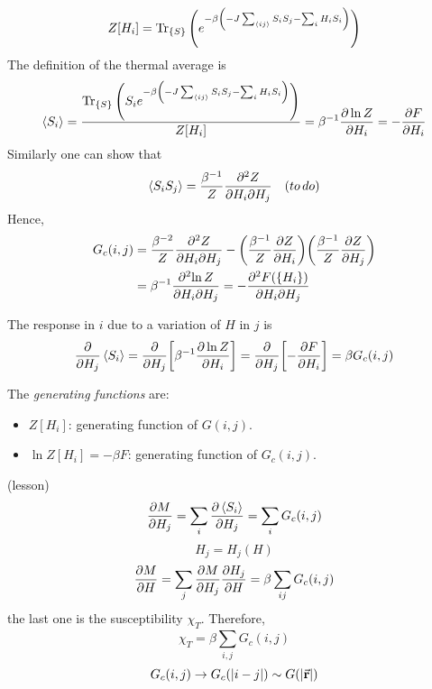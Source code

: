 \documentclass[../main/main.tex]{subfiles}
\begin{document}
\begin{equation}
  Z [H_i]= \Tr_{\{ S \} } \qty(e^{-\beta \qty(-J \sum_{\expval{ij} }^{} S_i S_j   - \sum_{i}^{} H_i S_i ) } )
\end{equation}
The definition of the thermal average is
\begin{equation}
  \expval{S_i} = \frac{\Tr_{\{ S \} } \qty(S_i e^{-\beta \qty(-J \sum_{\expval{ij} }^{} S_i S_j   - \sum_{i}^{} H_i S_i ) } ) }{Z[H_i]}
  = \beta ^{-1} \pdv{\ln{Z} }{H_i} = - \pdv{F}{H_i}
\end{equation}
Similarly one can show that
\begin{equation}
  \expval{S_i S_j} = \frac{\beta ^{-1}}{Z} \frac{\partial^2{Z} }{\partial{H_i} \partial{H_j}  } \quad (to \, do)
\end{equation}
Hence,
\begin{equation}
\begin{split}
  G_c (i,j) & = \frac{\beta ^{-2}}{Z}  \frac{\partial^2{Z} }{\partial{H_i} \partial{H_j}  }
  - \qty(\frac{\beta ^{-1}}{Z} \pdv{Z}{H_i} ) \qty(\frac{\beta ^{-1}}{Z} \pdv{Z}{H_j} ) \\
  & = \beta ^{-1} \frac{\partial^2{\ln{Z} } }{\partial{H_i} \partial{H_j}  }
  = - \frac{\partial^2{F(\{ H_i \}  )} }{\partial{H_i} \partial{H_j}  }
\end{split}
\end{equation}
\begin{remark}
  The response in \( i \) due to a variation of \( H \) in \( j \) is
  \begin{equation}
    \pdv{}{H_j} \expval{S_i} = \pdv{}{H_j} \qty[\beta ^{-1} \pdv{\ln{Z} }{H_i} ]  =\pdv{}{H_j} \qty[-\pdv{F}{H_i} ] =  \beta G_c (i,j)
  \end{equation}
\end{remark}

The \emph{generating functions} are:
\begin{itemize}
\item \( Z[H_i] \): generating function of \( G(i,j) \).
\item \( \ln{Z[H_i]} = - \beta F  \): generating function of \( G_c (i,j) \).
\end{itemize}

\begin{remark}
  (lesson)
  \begin{equation}
    \pdv{M}{H_j} = \sum_{i}^{} \pdv{\expval{S_i} }{H_j} = \sum_{i}^{} G_c (i,j)
  \end{equation}
  \begin{equation}
    H_j = H_j (H)
  \end{equation}
  \begin{equation}
    \pdv{M}{H} = \sum_{j}^{} \pdv{M}{H_j} \pdv{H_j}{H}
    =  \beta \sum_{ij}^{} G_c (i,j)
  \end{equation}
  the last one is the susceptibility \( \chi _T \).
   Therefore,
   \begin{equation}
     \chi _T = \beta \sum_{i,j}^{} G_c (i,j)
   \end{equation}
   \begin{equation}
     G_c (i,j) \rightarrow G_c (\abs{i-j} ) \sim G (\abs{\va{r}} )
   \end{equation}
\end{remark}
\end{document}
